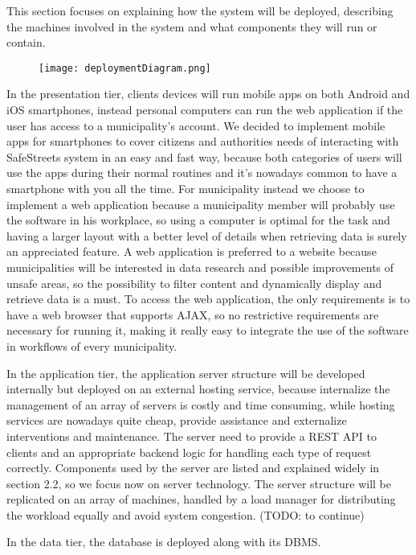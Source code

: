 This section focuses on explaining how the system will be deployed, describing the machines involved in the system and what components they will run or contain.

\begin{figure}[H]
	\texttt{[image: deploymentDiagram.png]}
\end{figure}

In the presentation tier, clients devices will run mobile apps on both Android and iOS smartphones, instead personal computers can run the web application if the user has access to a municipality's account. We decided to implement mobile apps for smartphones to cover citizens and authorities needs of interacting with SafeStreets system in an easy and fast way, because both categories of users will use the apps during their normal routines and it's nowadays common to have a smartphone with you all the time. For municipality instead we choose to implement a web application because a municipality member will probably use the software in his workplace, so using a computer is optimal for the task and having a larger layout with a better level of details when retrieving data is surely an appreciated feature. A web application is preferred to a website because municipalities will be interested in data research and possible improvements of unsafe areas, so the possibility to filter content and dynamically display and retrieve data is a must. To access the web application, the only requirements is to have a web browser that supports AJAX, so no restrictive requirements are necessary for running it, making it really easy to integrate the use of the software in workflows of every municipality.

In the application tier, the application server structure will be developed internally but deployed on an external hosting service, because internalize the management of an array of servers is costly and time consuming, while hosting services are nowadays quite cheap, provide assistance and externalize interventions and maintenance. The server need to provide a REST API to clients and an appropriate backend logic for handling each type of request correctly. Components used by the server are listed and explained widely in section 2.2, so we focus now on server technology. The server structure will be replicated on an array of machines, handled by a load manager for distributing the workload equally and avoid system congestion. (TODO: to continue)

In the data tier, the database is deployed along with its DBMS.
